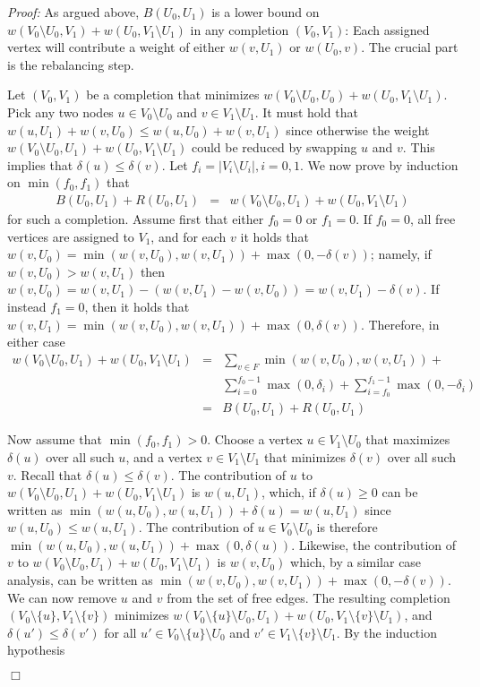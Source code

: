 \documentclass[a4paper,11pt]{article}
\newenvironment{proof}{\emph{Proof:}}{$\Box$\newline}
\begin{document}
\begin{proof}
As argued above, $B(U_0,U_1)$ is a lower bound on $w(V_0\setminus
U_0,V_1)+w(U_0,V_1\setminus U_1)$ in any completion $(V_0,V_1)$: Each
assigned vertex will contribute a weight of either $w(v,U_1)$ or
$w(U_0,v)$. The crucial part is the rebalancing step. 

Let $(V_0,V_1)$ be a completion that minimizes $w(V_0\setminus
U_0,U_0)+w(U_0,V_1\setminus U_1)$. Pick any two nodes $u\in
V_0\setminus U_0$ and $v\in V_1\setminus U_1$. It must hold that
$w(u,U_1)+w(v,U_0) \leq w(u,U_0)+w(v,U_1)$ since otherwise the weight
$w(V_0\setminus U_0,U_1)+w(U_0,V_1\setminus U_1)$ could be reduced by
swapping $u$ and $v$. This implies that $\delta(u)\leq\delta(v)$.  Let
$f_i=|V_i\setminus U_i|, i=0,1$.  We now prove by induction on
$\min(f_0,f_1)$ that
\begin{eqnarray*}
B(U_0,U_1)+R(U_0,U_1) & = & 
w(V_0\setminus U_0,U_1)+w(U_0,V_1\setminus U_1)
\end{eqnarray*}
for such a completion. Assume first that either $f_0=0$ or $f_1=0$. If
$f_0=0$, all free vertices are assigned to $V_1$, and for each $v$ it
holds that $w(v,U_0) = \min(w(v,U_0),w(v,U_1))+\max(0,-\delta(v))$;
namely, if $w(v,U_0)>w(v,U_1)$ then $w(v,U_0) =
w(v,U_1)-(w(v,U_1)-w(v,U_0))=w(v,U_1)-\delta(v)$.  If instead $f_1=0$,
then it holds that
$w(v,U_1)=\min(w(v,U_0),w(v,U_1))+\max(0,\delta(v))$. Therefore, in
either case
\begin{eqnarray*}
w(V_0\setminus U_0,U_1)+w(U_0,V_1\setminus U_1) & = & 
\sum_{v\in F}\min(w(v,U_0),w(v,U_1)) + \\
& &
\sum_{i=0}^{f_0-1}\max(0,\delta_i)+\sum_{i=f_0}^{f_1-1}\max(0,-\delta_i)
\\
& = & B(U_0,U_1)+R(U_0,U_1)
\end{eqnarray*}

Now assume that $\min(f_0,f_1)>0$. Choose a vertex $u\in
V_1\setminus U_0$ that maximizes $\delta(u)$ over all such $u$, and a
vertex $v\in V_1\setminus U_1$ that minimizes $\delta(v)$ over all
such $v$. Recall that $\delta(u)\leq\delta(v)$.  The contribution of
$u$ to $w(V_0\setminus U_0,U_1)+w(U_0,V_1\setminus U_1)$ is
$w(u,U_1)$, which, if $\delta(u)\geq 0$ can be written as
$\min(w(u,U_0),w(u,U_1))+\delta(u) = w(u,U_1)$ since $w(u,U_0)\leq
w(u,U_1)$. The contribution of $u\in V_0\setminus U_0$ is therefore
$\min(w(u,U_0),w(u,U_1))+\max(0,\delta(u))$. Likewise, the
contribution of $v$ to $w(V_0\setminus U_0,U_1)+w(U_0,V_1\setminus
U_1)$ is $w(v,U_0)$ which, by a similar case analysis, can be written
as $\min(w(v,U_0),w(v,U_1))+\max(0,-\delta(v))$. We can now remove $u$
and $v$ from the set of free edges. The resulting completion
$(V_0\setminus\{u\},V_1\setminus\{v\})$ minimizes
$w(V_0\setminus\{u\}\setminus
U_0,U_1)+w(U_0,V_1\setminus\{v\}\setminus U_1)$, and $\delta(u')\leq
\delta(v')$ for all $u'\in V_0\setminus\{u\}\setminus U_0$ and $v'\in
V_1\setminus\{v\}\setminus U_1$. By the induction hypothesis


\end{proof}
\end{document}
